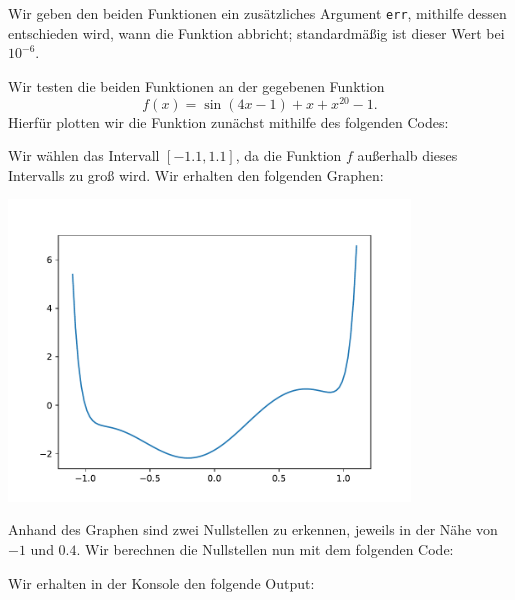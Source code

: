 \section{}

Wir geben den beiden Funktionen ein zusätzliches Argument \texttt{err}, mithilfe dessen entschieden wird, wann die Funktion abbricht; standardmäßig ist dieser Wert bei $10^{-6}$.



Wir testen die beiden Funktionen an der gegebenen Funktion
\[
    f(x)
  = \sin(4x - 1) + x + x^{20} - 1.
\]
Hierfür plotten wir die Funktion zunächst mithilfe des folgenden Codes:



Wir wählen das Intervall $[-1.1, 1.1]$, da die Funktion $f$ außerhalb dieses Intervalls zu groß wird.
Wir erhalten den folgenden Graphen:

\begin{center}
  \includegraphics[width = 0.8\textwidth]{chapter_04/exercise_04_13_figure.pdf}
\end{center}

Anhand des Graphen sind zwei Nullstellen zu erkennen, jeweils in der Nähe von $-1$ und $0.4$.
Wir berechnen die Nullstellen nun mit dem folgenden Code:
  


Wir erhalten in der Konsole den folgende Output:

